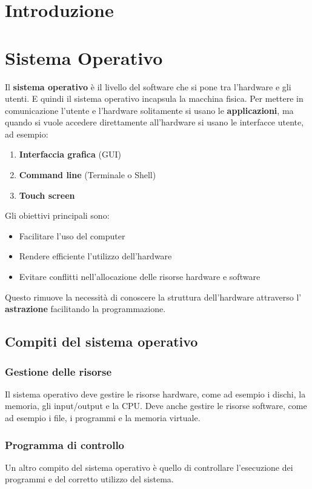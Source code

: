 \documentclass[a4paper]{article}
\begin{document}


\tableofcontents
\pagebreak

\section{Introduzione}

\section{Sistema Operativo}
Il \textbf{sistema operativo} è il livello del software che si pone tra l'hardware
e gli utenti. E quindi il sistema operativo incapsula la macchina fisica.
Per mettere in comunicazione l'utente e l'hardware solitamente si usano le 
\textbf{applicazioni}, ma quando si vuole accedere direttamente all'hardware
si usano le interfacce utente, ad esempio:
\begin{enumerate}
  \item \textbf{Interfaccia grafica} (GUI)
  \item \textbf{Command line} (Terminale o Shell)
  \item \textbf{Touch screen}
\end{enumerate}
\noindent
Gli obiettivi principali sono:
\begin{itemize}
  \item Facilitare l'uso del computer
  \item Rendere efficiente l'utilizzo dell'hardware
  \item Evitare conflitti nell'allocazione delle risorse hardware e software
\end{itemize}
Questo rimuove la necessità di conoscere la struttura dell'hardware attraverso l'
\textbf{astrazione} facilitando la programmazione.

\subsection{Compiti del sistema operativo}
\subsubsection{Gestione delle risorse}
Il sistema operativo deve gestire le risorse hardware, come ad esempio i dischi, la memoria,
gli input/output e la CPU. Deve anche gestire le risorse software, come ad esempio i file,
i programmi e la memoria virtuale.

\subsubsection{Programma di controllo}
Un altro compito del sistema operativo è quello di controllare l'esecuzione dei programmi
e del corretto utilizzo del sistema.
\end{document}
